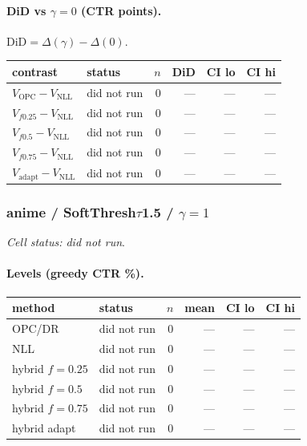 \documentclass[10pt,a4paper]{article}
\begin{document}
\paragraph{DiD vs $\gamma=0$ (CTR points).} $\mathrm{DiD}=\Delta(\gamma)-\Delta(0)$.
{\centering\small\begin{tabular}{llrrrr}
\toprule contrast & status & $n$ & DiD & CI lo & CI hi \\
\midrule
$V_{\mathrm{OPC}}-V_{\mathrm{NLL}}$ & did not run & 0 & --- & --- & --- \\
$V_{f0.25}-V_{\mathrm{NLL}}$ & did not run & 0 & --- & --- & --- \\
$V_{f0.5}-V_{\mathrm{NLL}}$ & did not run & 0 & --- & --- & --- \\
$V_{f0.75}-V_{\mathrm{NLL}}$ & did not run & 0 & --- & --- & --- \\
$V_{\mathrm{adapt}}-V_{\mathrm{NLL}}$ & did not run & 0 & --- & --- & --- \\
\bottomrule\end{tabular}\par}
\bigskip
\subsubsection{anime / SoftThresh$\tau$1.5 / $\gamma=1$}
\emph{Cell status: did not run}.
\paragraph{Levels (greedy CTR \%).}
{\centering\small\begin{tabular}{llrrrr}
\toprule method & status & $n$ & mean & CI lo & CI hi \\
\midrule
OPC/DR & did not run & 0 & --- & --- & --- \\
NLL & did not run & 0 & --- & --- & --- \\
hybrid $f{=}0.25$ & did not run & 0 & --- & --- & --- \\
hybrid $f{=}0.5$ & did not run & 0 & --- & --- & --- \\
hybrid $f{=}0.75$ & did not run & 0 & --- & --- & --- \\
hybrid adapt & did not run & 0 & --- & --- & --- \\
\bottomrule\end{tabular}\par}
\end{document}
